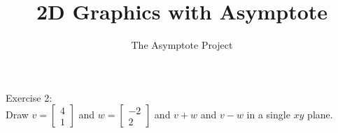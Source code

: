 \documentclass[12pt]{article}
\title{2D Graphics with Asymptote}
\author{The Asymptote Project}
\newcommand{\insertrep}[1]{%
	\hspace*{-2.4cm}
	\fbox{\texttt{[image: \#1]}}
}
\begin{document}
Exercise 2:\\
Draw $v=\begin{bmatrix}4\\1\end{bmatrix}$ and $w=\begin{bmatrix}-2\\2\end{bmatrix}$ and $v+w$ and $v-w$ in a single $xy$ plane.\\
\begin{center}
	\insertrep{exercise01002.pdf}
\end{center}
\end{document}
